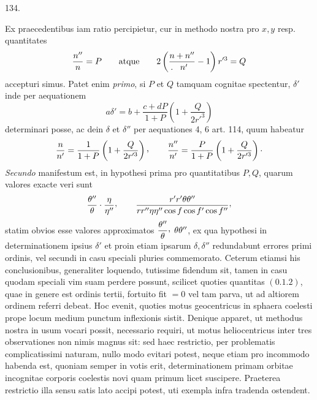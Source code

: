 \par{}\medskip
\begin{center}\hypertarget{native-180-article134}{}134.\end{center}
Ex praecedentibus iam ratio percipietur, cur in methodo nostra pro $x,y$
resp. quantitates
\[
\frac{n''}{n}=P\qquad\text{atque}\qquad
2\left(\frac{n+n''}{\mathpunct{\mkern-12mu.\mkern12mu}n'}-1\right)r'^3=Q
\]
accepturi simus. Patet enim \textit{primo}, si $P$ et $Q$ tamquam cognitae spectentur,
$\delta'$ inde per aequationem
\[
a\delta'=b+\frac{c+dP}{1+P}\left(1+\frac{Q}{2r'^3}\right)
\]
determinari posse, ac dein $\delta$ et $\delta''$ per aequationes 4, 6 art. 114, quum habeatur
\[
\frac{n}{n'}=\frac{1}{1+P}\left(1+\frac{Q}{2r'^3}\right)\mathpunct{\raisebox{.45ex}{,}}\qquad
\frac{n''}{n'}=\frac{P}{1+P}\left(1+\frac{Q}{2r'^3}\right)\mathpunct{\cdot}
\]
\textit{Secundo} manifestum est, in hypothesi prima pro quantitatibus $P,Q$, quarum
valores exacte veri sunt
\hypertarget{native-181}{}
\[
\frac{\theta''}{\theta}\cdot\frac{\eta}{\eta''}\mathpunct{\raisebox{.45ex}{,}}\qquad
\frac{r'r'\theta\theta''}{rr''\eta\eta''\cos f\cos f'\cos f''}\mathpunct{\raisebox{.45ex}{,}}
\]
statim obvios esse valores approximatos $\dfrac{\theta''}{\theta}\mathpunct{\raisebox{.45ex}{,}}\;\theta\theta''$, ex qua hypothesi in determinationem
ipsius $\delta'$ et proin etiam ipsarum $\delta,\delta''$ redundabunt errores primi
ordinis, vel secundi in casu speciali pluries commemorato. Ceterum etiamsi
his conclusionibus, generaliter loquendo, tutissime fidendum sit, tamen in casu
quodam speciali vim suam perdere possunt, scilicet quoties quantitas $(0.1.2)$,
quae in genere est ordinis tertii, fortuito fit $=0$ vel tam parva, ut ad altiorem
ordinem referri debeat. Hoc evenit, quoties motus geocentricus in sphaera
coelesti prope locum medium punctum inflexionis sistit. Denique apparet, ut
methodus nostra in usum vocari possit, necessario requiri, ut motus heliocentricus
inter tres observationes non nimis magnus sit: sed haec restrictio, per
problematis complicatissimi naturam, nullo modo evitari potest, neque etiam
pro incommodo habenda est, quoniam semper in votis erit, determinationem
primam orbitae incognitae corporis coelestis novi quam primum licet suscipere.
Praeterea restrictio illa sensu satis lato accipi potest, uti exempla infra tradenda
ostendent.
